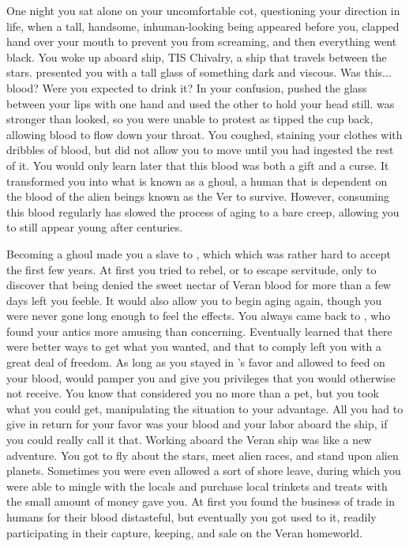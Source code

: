 \documentclass[char]{guildcamp4}
\begin{document}
One night you sat alone on your uncomfortable cot, questioning your direction in life, when a tall, handsome, inhuman-looking being appeared before you, clapped \cVone{\their} hand over your mouth to prevent you from screaming, and then everything went black. You woke up aboard \cVone{\their} ship, TIS Chivalry, a ship that travels between the stars. \cVone{\They} presented you with a tall glass of something dark and viscous. Was this... blood? Were you expected to drink it? In your confusion, \cVone{} pushed the glass between your lips with one hand and used the other to hold your head still. \cVone{\They} was stronger than \cVone{\they} looked, so you were unable to protest as \cVone{} tipped the cup back, allowing \cVone{\their} blood to flow down your throat. You coughed, staining your clothes with dribbles of blood, but \cVone{} did not allow you to move until you had ingested the rest of it. You would only learn later that this blood was both a gift and a curse. It transformed you into what is known as a ghoul, a human that is dependent on the blood of the alien beings known as the Ver to survive. However, consuming this blood regularly has slowed the process of aging to a bare creep, allowing you to still appear young after centuries.

Becoming a ghoul made you a slave to \cVone{}, which which was rather hard to accept the first few years. At first you tried to rebel, or to escape servitude, only to discover that being denied the sweet nectar of Veran blood for more than a few days left you feeble. It would also allow you to begin aging again, though you were never gone long enough to feel the effects. You always came back to \cVone{}, who found your antics more amusing than concerning. Eventually learned that there were better ways to get what you wanted, and that to comply left you with a great deal of freedom. As long as you stayed in \cVone{}'s favor and allowed \cVone{\them} to feed on your blood, \cVone{\they} would pamper you and give you privileges that you would otherwise not receive. You know that \cVone{} considered you no more than a pet, but you took what you could get, manipulating the situation to your advantage. All you had to give in return for your favor was your blood and your labor aboard the ship, if you could really call it that. Working aboard the Veran ship was like a new adventure. You got to fly about the stars, meet alien races, and stand upon alien planets. Sometimes you were even allowed a sort of shore leave, during which you were able to mingle with the locals and purchase local trinkets and treats with the small amount of money \cVone{} gave you. At first you found the business of trade in humans for their blood distasteful, but eventually you got used to it, readily participating in their capture, keeping, and sale on the Veran homeworld.
\end{document}
